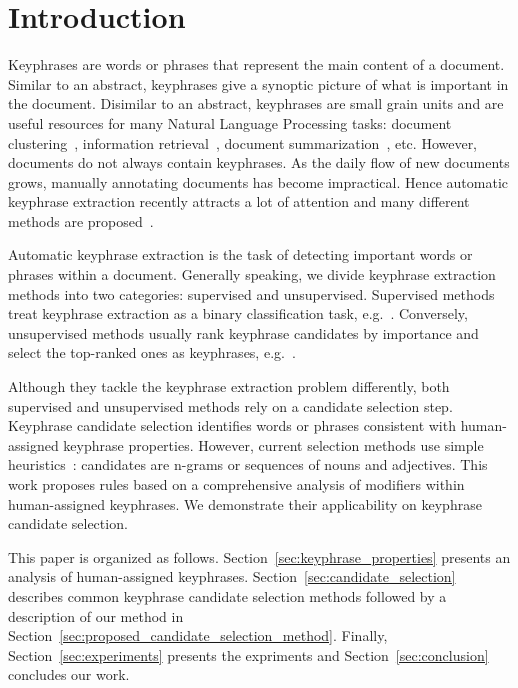 \section{Introduction}
\label{sec:section}
    Keyphrases are words or phrases that represent the main content of a document.
    Similar to an abstract, keyphrases give a synoptic picture of what is important in the document.
    Disimilar to an abstract, keyphrases are small grain units and are useful resources for many Natural Language Processing tasks: document clustering~\cite{han2007webdocumentclustering}, information retrieval~\cite{medelyan2008smalltrainingset}, document summarization~\cite{litvak2008graphbased}, etc.
    However, documents do not always contain keyphrases.
    As the daily flow of new documents grows, manually annotating documents has become impractical.
    Hence automatic keyphrase extraction recently attracts a lot of attention and many different methods are proposed~\cite{hasan2014state_of_the_art}.

    Automatic keyphrase extraction is the task of detecting important words or phrases within a document.
    Generally speaking, we divide keyphrase extraction methods into two categories: supervised and unsupervised.
    Supervised methods treat keyphrase extraction as a binary classification task, e.g.~\cite{witten1999kea}.
    Conversely, unsupervised methods usually rank keyphrase candidates by importance and select the top-ranked ones as keyphrases, e.g.~\cite{mihalcea2004textrank}.

    Although they tackle the keyphrase extraction problem differently, both supervised and unsupervised methods rely on a candidate selection step.
    Keyphrase candidate selection identifies words or phrases consistent with human-assigned keyphrase properties.
    However, current selection methods use simple heuristics~\cite{wang2014keyphraseextractionpreprocessing}: candidates are n-grams or sequences of nouns and adjectives.
    This work proposes rules based on a comprehensive analysis of modifiers within human-assigned keyphrases.
    We demonstrate their applicability on keyphrase candidate selection.
    
    This paper is organized as follows.
    Section~\ref{sec:keyphrase_properties} presents an analysis of human-assigned keyphrases.
    Section~\ref{sec:candidate_selection} describes common keyphrase candidate selection methods followed by a description of our method in Section~\ref{sec:proposed_candidate_selection_method}. Finally, Section~\ref{sec:experiments} presents the expriments and Section~\ref{sec:conclusion} concludes our work.
